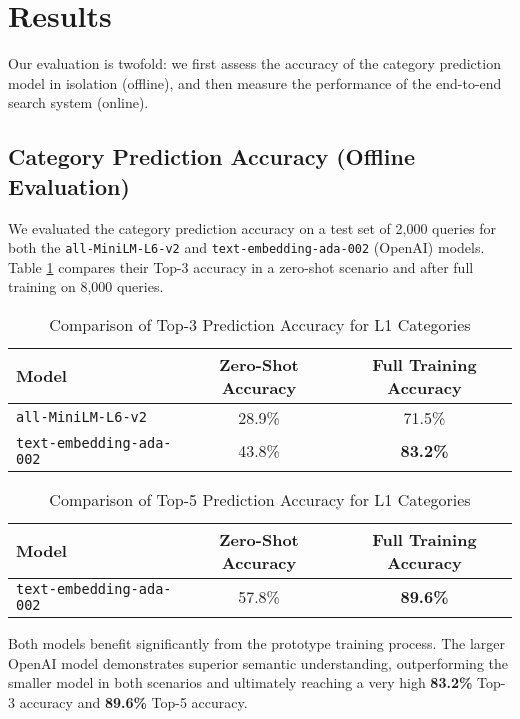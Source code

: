 \documentclass[12pt, a4paper]{article}
\begin{document}
\section{Results}

Our evaluation is twofold: we first assess the accuracy of the category prediction model in isolation (offline), and then measure the performance of the end-to-end search system (online).

\subsection{Category Prediction Accuracy (Offline Evaluation)}

We evaluated the category prediction accuracy on a test set of 2,000 queries for both the \texttt{all-MiniLM-L6-v2} and \texttt{text-embedding-ada-002} (OpenAI) models. Table \ref{tab:offline_accuracy} compares their Top-3 accuracy in a zero-shot scenario and after full training on 8,000 queries.

\begin{table}[H]
\centering
\caption{Comparison of Top-3 Prediction Accuracy for L1 Categories}
\label{tab:offline_accuracy}
\begin{tabular}{@{}lcc@{}}
\toprule
\textbf{Model} & \textbf{Zero-Shot Accuracy} & \textbf{Full Training Accuracy} \\ \midrule
\texttt{all-MiniLM-L6-v2} & 28.9\% & 71.5\% \\
\texttt{text-embedding-ada-002} & 43.8\% & \textbf{83.2\%} \\ \bottomrule
\end{tabular}
\end{table}

\begin{table}[H]
\centering
\caption{Comparison of Top-5 Prediction Accuracy for L1 Categories}
\label{tab:offline_accuracy_top5}
\begin{tabular}{@{}lcc@{}}
\toprule
\textbf{Model} & \textbf{Zero-Shot Accuracy} & \textbf{Full Training Accuracy} \\ \midrule
\texttt{text-embedding-ada-002} & 57.8\% & \textbf{89.6\%} \\ \bottomrule
\end{tabular}
\end{table}

Both models benefit significantly from the prototype training process. The larger OpenAI model demonstrates superior semantic understanding, outperforming the smaller model in both scenarios and ultimately reaching a very high \textbf{83.2\%} Top-3 accuracy and \textbf{89.6\%} Top-5 accuracy.
\end{document}
